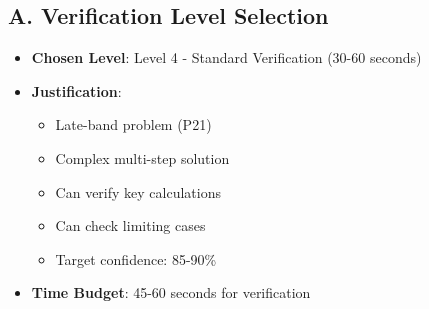 \documentclass[12pt]{article}
\begin{document}
\begin{verificationbox}
\subsection*{A. Verification Level Selection}
\begin{itemize}[leftmargin=*]
    \item \textbf{Chosen Level}: Level 4 - Standard Verification (30-60 seconds)
    \item \textbf{Justification}: 
    \begin{itemize}
        \item Late-band problem (P21)
        \item Complex multi-step solution
        \item Can verify key calculations
        \item Can check limiting cases
        \item Target confidence: 85-90\%
    \end{itemize}
    \item \textbf{Time Budget}: 45-60 seconds for verification
\end{itemize}


\end{verificationbox}
\end{document}
